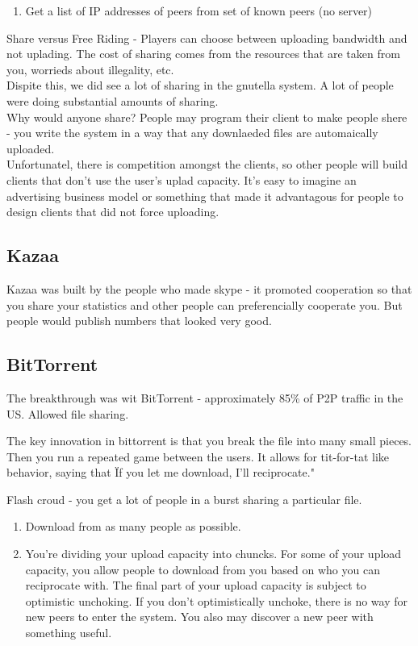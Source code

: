 \documentclass[12pt]{article}   	%
\begin{document}
\begin{enumerate}
\item Get a list of IP addresses of peers from set of known peers (no server)
\end{enumerate}

Share versus Free Riding - Players can choose between uploading bandwidth and not uplading. The cost of sharing comes from the resources that are taken from you, worrieds about illegality, etc. \\

Dispite this, we did see a lot of sharing in the gnutella system. A lot of people were doing substantial amounts of sharing. \\

Why would anyone share? People may program their client to make people shere - you write the system in a way that any downlaeded files are automaically uploaded. \\
Unfortunatel, there is competition amongst the clients, so other people will build clients that don't use the user's uplad capacity. It's easy to imagine an advertising business model or something that made it advantagous for people to design clients that did not force uploading.\\
\subsection{Kazaa}
Kazaa was built by the people who made skype - it promoted cooperation so that you share your statistics and other people can preferencially cooperate you. But people would publish numbers that looked very good. 
\subsection{BitTorrent}
The breakthrough was wit BitTorrent - approximately 85\% of P2P traffic in the US. Allowed file sharing.

The key innovation in bittorrent is that you break the file into many small pieces. Then you run a repeated game between the users. It allows for tit-for-tat like behavior, saying that \"If you let me download, I'll reciprocate."

Flash croud - you get a lot of people in a burst sharing a particular file.

\begin{enumerate}
\item Download from as many people as possible.
\item You're dividing your upload capacity into chuncks. For some of your upload capacity, you allow people to download from you based on who you can reciprocate with. The final part of your upload capacity is subject to optimistic unchoking. If you don't optimistically unchoke, there is no way for new peers to enter the system. You also may discover a new peer with something useful. 

\end{enumerate}
\end{document}
